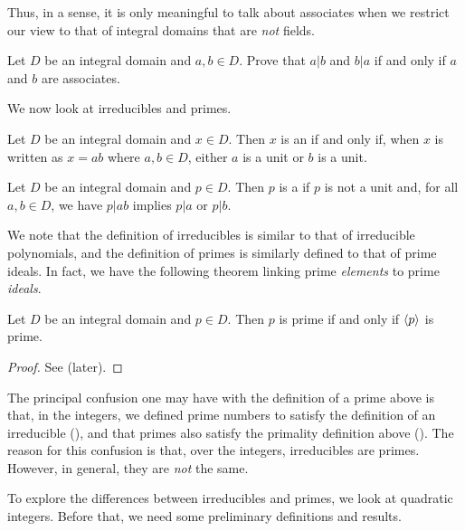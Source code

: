 Thus, in a sense, it is only meaningful to talk about associates when we restrict our view to that of integral domains that are \textit{not} fields.

\begin{exercise}
    Let $D$ be an integral domain and $a,b \in D$. Prove that $a \vert b$ and $b \vert a$ if and only if $a$ and $b$ are associates.
\end{exercise}

We now look at irreducibles and primes.
\begin{definition}
    Let $D$ be an integral domain and $x \in D$. Then $x$ is an  if and only if, when $x$ is written as $x = ab$ where $a, b \in D$, either $a$ is a unit or $b$ is a unit.
\end{definition}
\begin{definition}
    Let $D$ be an integral domain and $p \in D$. Then $p$ is a  if $p$ is not a unit and, for all $a, b \in D$, we have $p \vert ab$ implies $p \vert a$ or $p \vert b$.
\end{definition}

We note that the definition of irreducibles is similar to that of irreducible polynomials, and the definition of primes is similarly defined to that of prime ideals. In fact, we have the following theorem linking prime \textit{elements} to prime \textit{ideals}.
\begin{theorem}\label{thrm-prime-element-iff-generates-prime-ideal}
    Let $D$ be an integral domain and $p \in D$. Then $p$ is prime if and only if $\left\langle p\right\rangle$ is prime.
\end{theorem}
\begin{proof}
    See  (later).
\end{proof}

The principal confusion one may have with the definition of a prime above is that, in the integers, we defined prime numbers to satisfy the definition of an irreducible (), and that primes also satisfy the primality definition above (). The reason for this confusion is that, over the integers, irreducibles are primes. However, in general, they are \textit{not} the same.

To explore the differences between irreducibles and primes, we look at quadratic integers. Before that, we need some preliminary definitions and results.

